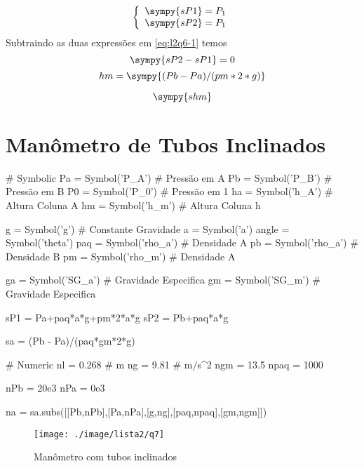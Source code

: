 \documentclass[a4paper,twocolumn,11pt]{article}
\begin{document}
\begin{equation}\label{eq:l2q6-1}
\left\{
\begin{array}{l}
\sympy{sP1} = P_1\\
\sympy{sP2} = P_1\\
\end{array}
\right.
\end{equation}
Subtraindo as duas expressões em \eqref{eq:l2q6-1} temos
$$\sympy{sP2-sP1} = 0$$
\begin{equation}\label{eq:l2q6-2}
hm = \sympy{(Pb-Pa)/(pm*2*g)}
\end{equation}

\begin{equation}
\sympy{shm}
\end{equation}

\section{Manômetro de Tubos Inclinados} %
\begin{sympycode}
# Symbolic
Pa = Symbol('P_A') # Pressão em A
Pb = Symbol('P_B') # Pressão em B
P0 = Symbol('P_0') # Pressão em 1
ha = Symbol('h_A') # Altura Coluna A
hm = Symbol('h_m') # Altura Coluna h

g = Symbol('g') # Constante Gravidade
a = Symbol('a')
angle = Symbol('theta')
paq = Symbol('rho_a') # Densidade A
pb = Symbol('rho_a') # Densidade B
pm = Symbol('rho_m') # Densidade A

ga = Symbol('SG_a') # Gravidade Especifica
gm = Symbol('SG_m') # Gravidade Especifica

sP1 = Pa+paq*a*g+pm*2*a*g
sP2 = Pb+paq*a*g

sa = (Pb - Pa)/(paq*gm*2*g)

# Numeric
nl = 0.268 # m
ng = 9.81  # m/s^2
ngm = 13.5
npaq = 1000

nPb = 20e3
nPa = 0e3

na = sa.subs([[Pb,nPb],[Pa,nPa],[g,ng],[paq,npaq],[gm,ngm]])
\end{sympycode}

\begin{figure}[H]
\centering
\label{fig:l2q7}
\texttt{[image: ./image/lista2/q7]}
\caption{Manômetro com tubos inclinados}
\end{figure}
\end{document}
